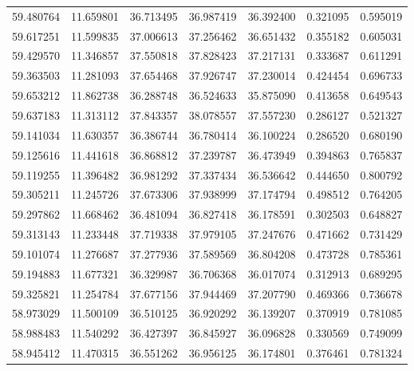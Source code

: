 \begin{tabular}{rrrrrrr}
 59.480764 &  11.659801 &         36.713495 &         36.987419 &         36.392400 &  0.321095 &  0.595019 \\
 59.617251 &  11.599835 &         37.006613 &         37.256462 &         36.651432 &  0.355182 &  0.605031 \\
 59.429570 &  11.346857 &         37.550818 &         37.828423 &         37.217131 &  0.333687 &  0.611291 \\
 59.363503 &  11.281093 &         37.654468 &         37.926747 &         37.230014 &  0.424454 &  0.696733 \\
 59.653212 &  11.862738 &         36.288748 &         36.524633 &         35.875090 &  0.413658 &  0.649543 \\
 59.637183 &  11.313112 &         37.843357 &         38.078557 &         37.557230 &  0.286127 &  0.521327 \\
 59.141034 &  11.630357 &         36.386744 &         36.780414 &         36.100224 &  0.286520 &  0.680190 \\
 59.125616 &  11.441618 &         36.868812 &         37.239787 &         36.473949 &  0.394863 &  0.765837 \\
 59.119255 &  11.396482 &         36.981292 &         37.337434 &         36.536642 &  0.444650 &  0.800792 \\
 59.305211 &  11.245726 &         37.673306 &         37.938999 &         37.174794 &  0.498512 &  0.764205 \\
 59.297862 &  11.668462 &         36.481094 &         36.827418 &         36.178591 &  0.302503 &  0.648827 \\
 59.313143 &  11.233448 &         37.719338 &         37.979105 &         37.247676 &  0.471662 &  0.731429 \\
 59.101074 &  11.276687 &         37.277936 &         37.589569 &         36.804208 &  0.473728 &  0.785361 \\
 59.194883 &  11.677321 &         36.329987 &         36.706368 &         36.017074 &  0.312913 &  0.689295 \\
 59.325821 &  11.254784 &         37.677156 &         37.944469 &         37.207790 &  0.469366 &  0.736678 \\
 58.973029 &  11.500109 &         36.510125 &         36.920292 &         36.139207 &  0.370919 &  0.781085 \\
 58.988483 &  11.540292 &         36.427397 &         36.845927 &         36.096828 &  0.330569 &  0.749099 \\
 58.945412 &  11.470315 &         36.551262 &         36.956125 &         36.174801 &  0.376461 &  0.781324 \\

\end{tabular}
